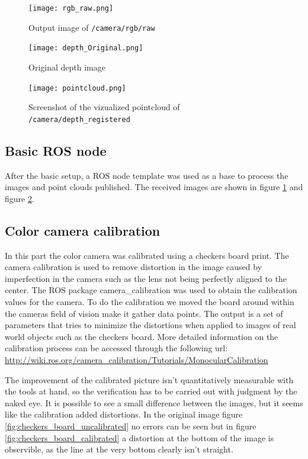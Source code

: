 \documentclass[DIV12,a4paper]{scrartcl}
\begin{document}
\begin{figure}
  \centering
  \texttt{[image: rgb\_raw.png]}
  \caption{Output image of \texttt{/camera/rgb/raw}}
  \label{fig:rgb-raw}
\end{figure}


\begin{figure}[h!tbp]
  \centering
  \texttt{[image: depth\_Original.png]}
  \caption{Original depth image}
  \label{fig:original_depth}
\end{figure}

\begin{figure}[h!tbp]
  \centering
  \texttt{[image: pointcloud.png]}
  \caption{Screenshot of the vizualized pointcloud of \texttt{/camera/depth\_registered}}
  \label{fig:depth_registered}
\end{figure}

\subsection{Basic ROS node}
\label{sec:basic-ros}
After the basic setup, a ROS node template was used as a base to process the images and point clouds published. The received images are shown in figure \ref{fig:rgb-raw} and figure \ref{fig:original_depth}.
\subsection{Color camera calibration}
\label{sec:calibration}
In this part the color camera was calibrated using a checkers board print. The camera calibration is used to remove distortion in the image caused by imperfection in the camera such as the lens not being perfectly aligned to the center. The ROS package camera\_calibration was used to obtain the calibration values for the camera. To do the calibration we moved the board around within the cameras field of vision make it gather data points. The output is a set of parameters that tries to minimize the distortions when applied to images of real world objects such as the checkers board. More detailed information on the calibration process can be accessed through the following url: \url{http://wiki.ros.org/camera_calibration/Tutorials/MonocularCalibration}
\par
The improvement of the calibrated picture isn't quantitatively measurable with the tools at hand, so the verification has to be carried out with judgment by the naked eye. It is possible to see a small difference between the images, but it seems like the calibration added distortions. In the original image figure \ref{fig:checkers_board_uncalibrated} no errors can be seen but in figure \ref{fig:checkers_board_calibrated} a distortion at the bottom of the image is observible, as the line at the very bottom clearly isn't straight.
\end{document}
